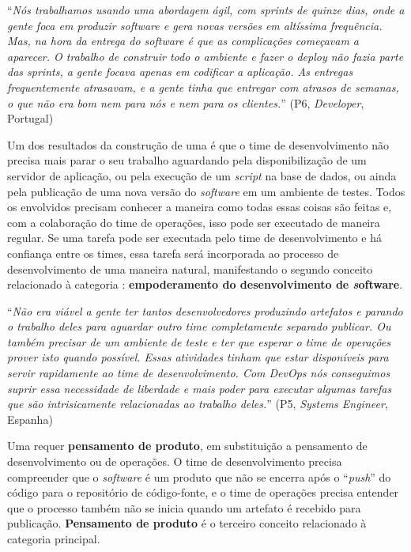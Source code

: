 \begin{mq}
``\emph{Nós trabalhamos usando uma abordagem ágil, com {\it sprints} de quinze
dias, onde a gente foca em produzir {\it software} e gera novas versões em
altíssima frequência. Mas, na hora da entrega do {\it software} é que as
complicações começavam a aparecer. O trabalho de construir todo o ambiente
e fazer o {\it deploy} não fazia parte das {\it sprints}, a gente focava apenas
em codificar a aplicação. As entregas frequentemente atrasavam,
e a gente tinha que entregar com atrasos de semanas, o que não era bom nem para
nós e nem para os clientes.}'' (P6, {\it Developer}, Portugal)
\end{mq}

Um dos resultados da construção de uma \cc é que o time de desenvolvimento não
precisa mais parar o seu trabalho aguardando pela disponibilização de um
servidor de aplicação, ou pela execução de um {\it script} na base de dados, ou
ainda pela publicação de uma nova versão do {\it software} em um ambiente de
testes. Todos os envolvidos precisam conhecer a maneira como todas essas coisas
são feitas e, com a colaboração do time de operações, isso pode ser executado
de maneira regular. Se uma tarefa pode ser executada pelo time de desenvolvimento
e há confiança entre os times, essa tarefa será incorporada ao processo de
desenvolvimento de uma maneira natural, manifestando o segundo conceito
relacionado à categoria \cc: {\bf empoderamento do desenvolvimento de {\emph software}}.

\begin{mq}
``\emph{Não era viável a gente ter tantos desenvolvedores produzindo artefatos e
parando o trabalho deles para aguardar outro time completamente separado
publicar. Ou também precisar de um ambiente de teste e ter que esperar o time
de operações prover isto quando possível. Essas atividades tinham que estar
disponíveis para servir rapidamente ao time de desenvolvimento. Com DevOps
nós conseguimos suprir essa necessidade de liberdade e mais poder para executar
algumas tarefas que são intrisicamente relacionadas ao trabalho deles.}''
(P5, {\it Systems Engineer}, Espanha)
\end{mq}

Uma \cc requer {\bf pensamento de produto}, em substituição a pensamento de
desenvolvimento ou de operações. O time de desenvolvimento precisa compreender
que o {\it software} é um produto que não se encerra após o ``{\it push}'' do código
para o repositório de código-fonte, e o time de operações precisa entender que
o processo também não se inicia quando um artefato é recebido para publicação.
{\bf Pensamento de produto} é o terceiro conceito relacionado à categoria
principal.

